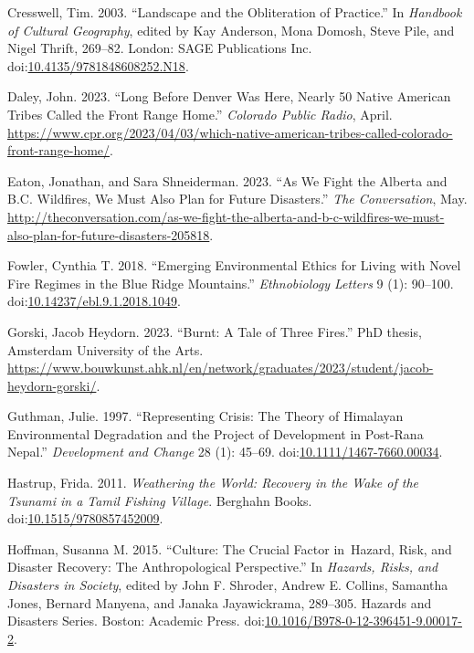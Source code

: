\documentclass[
]{article}
\newlength{\cslhangindent}
\newenvironment{CSLReferences}[2] %
 {\begin{list}{}{%
  \setlength{\itemindent}{0pt}
  \setlength{\leftmargin}{0pt}
  \setlength{\parsep}{0pt}
  \ifodd #1
   \setlength{\leftmargin}{\cslhangindent}
   \setlength{\itemindent}{-1\cslhangindent}
  \fi
  \setlength{\itemsep}{#2\baselineskip}}}
 {\end{list}}
\begin{document}
\begin{CSLReferences}{1}{0}
Cresswell, Tim. 2003. {``Landscape and the Obliteration of Practice.''} In \emph{Handbook of {Cultural Geography}}, edited by Kay Anderson, Mona Domosh, Steve Pile, and Nigel Thrift, 269--82. London: SAGE Publications Inc. doi:\href{https://doi.org/10.4135/9781848608252.N18}{10.4135/9781848608252.N18}.

Daley, John. 2023. {``Long Before {Denver} Was Here, Nearly 50 {Native American} Tribes Called the {Front Range} Home.''} \emph{Colorado Public Radio}, April. \url{https://www.cpr.org/2023/04/03/which-native-american-tribes-called-colorado-front-range-home/}.

Eaton, Jonathan, and Sara Shneiderman. 2023. {``As We Fight the {Alberta} and {B}.{C}. Wildfires, We Must Also Plan for Future Disasters.''} \emph{The Conversation}, May. \url{http://theconversation.com/as-we-fight-the-alberta-and-b-c-wildfires-we-must-also-plan-for-future-disasters-205818}.

Fowler, Cynthia T. 2018. {``Emerging {Environmental Ethics} for {Living} with {Novel Fire Regimes} in the {Blue Ridge Mountains}.''} \emph{Ethnobiology Letters} 9 (1): 90--100. doi:\href{https://doi.org/10.14237/ebl.9.1.2018.1049}{10.14237/ebl.9.1.2018.1049}.

Gorski, Jacob Heydorn. 2023. {``Burnt: {A Tale} of {Three Fires}.''} PhD thesis, Amsterdam University of the Arts. \url{https://www.bouwkunst.ahk.nl/en/network/graduates/2023/student/jacob-heydorn-gorski/}.

Guthman, Julie. 1997. {``Representing {Crisis}: {The Theory} of {Himalayan Environmental Degradation} and the {Project} of {Development} in {Post-Rana Nepal}.''} \emph{Development and Change} 28 (1): 45--69. doi:\href{https://doi.org/10.1111/1467-7660.00034}{10.1111/1467-7660.00034}.

Hastrup, Frida. 2011. \emph{Weathering the {World}: {Recovery} in the {Wake} of the {Tsunami} in a {Tamil Fishing Village}}. Berghahn Books. doi:\href{https://doi.org/10.1515/9780857452009}{10.1515/9780857452009}.

Hoffman, Susanna M. 2015. {``Culture: {The Crucial Factor} in~{Hazard}, {Risk}, and {Disaster Recovery}: {The Anthropological Perspective}.''} In \emph{Hazards, {Risks}, and {Disasters} in {Society}}, edited by John F. Shroder, Andrew E. Collins, Samantha Jones, Bernard Manyena, and Janaka Jayawickrama, 289--305. Hazards and {Disasters Series}. Boston: Academic Press. doi:\href{https://doi.org/10.1016/B978-0-12-396451-9.00017-2}{10.1016/B978-0-12-396451-9.00017-2}.


\end{CSLReferences}
\end{document}
